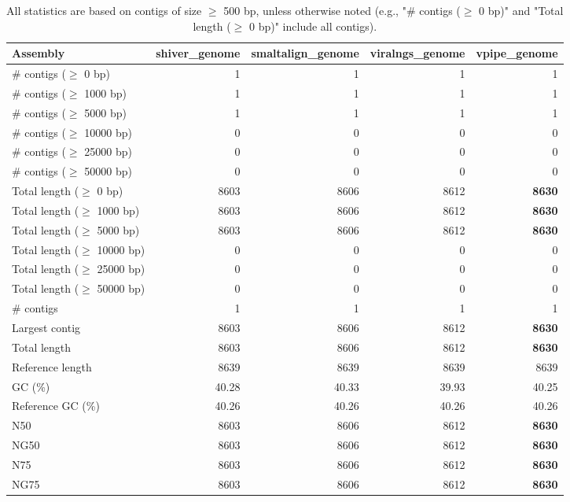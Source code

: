 \documentclass[12pt,a4paper]{article}
\begin{document}
\begin{table}[ht]
\begin{center}
\caption{All statistics are based on contigs of size $\geq$ 500 bp, unless otherwise noted (e.g., "\# contigs ($\geq$ 0 bp)" and "Total length ($\geq$ 0 bp)" include all contigs).}
\begin{tabular}{|l*{4}{|r}|}
\hline
Assembly & shiver\_genome & smaltalign\_genome & viralngs\_genome & vpipe\_genome \\ \hline
\# contigs ($\geq$ 0 bp) & 1 & 1 & 1 & 1 \\ \hline
\# contigs ($\geq$ 1000 bp) & 1 & 1 & 1 & 1 \\ \hline
\# contigs ($\geq$ 5000 bp) & 1 & 1 & 1 & 1 \\ \hline
\# contigs ($\geq$ 10000 bp) & 0 & 0 & 0 & 0 \\ \hline
\# contigs ($\geq$ 25000 bp) & 0 & 0 & 0 & 0 \\ \hline
\# contigs ($\geq$ 50000 bp) & 0 & 0 & 0 & 0 \\ \hline
Total length ($\geq$ 0 bp) & 8603 & 8606 & 8612 & {\bf 8630} \\ \hline
Total length ($\geq$ 1000 bp) & 8603 & 8606 & 8612 & {\bf 8630} \\ \hline
Total length ($\geq$ 5000 bp) & 8603 & 8606 & 8612 & {\bf 8630} \\ \hline
Total length ($\geq$ 10000 bp) & 0 & 0 & 0 & 0 \\ \hline
Total length ($\geq$ 25000 bp) & 0 & 0 & 0 & 0 \\ \hline
Total length ($\geq$ 50000 bp) & 0 & 0 & 0 & 0 \\ \hline
\# contigs & 1 & 1 & 1 & 1 \\ \hline
Largest contig & 8603 & 8606 & 8612 & {\bf 8630} \\ \hline
Total length & 8603 & 8606 & 8612 & {\bf 8630} \\ \hline
Reference length & 8639 & 8639 & 8639 & 8639 \\ \hline
GC (\%) & 40.28 & 40.33 & 39.93 & 40.25 \\ \hline
Reference GC (\%) & 40.26 & 40.26 & 40.26 & 40.26 \\ \hline
N50 & 8603 & 8606 & 8612 & {\bf 8630} \\ \hline
NG50 & 8603 & 8606 & 8612 & {\bf 8630} \\ \hline
N75 & 8603 & 8606 & 8612 & {\bf 8630} \\ \hline
NG75 & 8603 & 8606 & 8612 & {\bf 8630} \\ \hline

\end{tabular}
\end{center}
\end{table}
\end{document}
